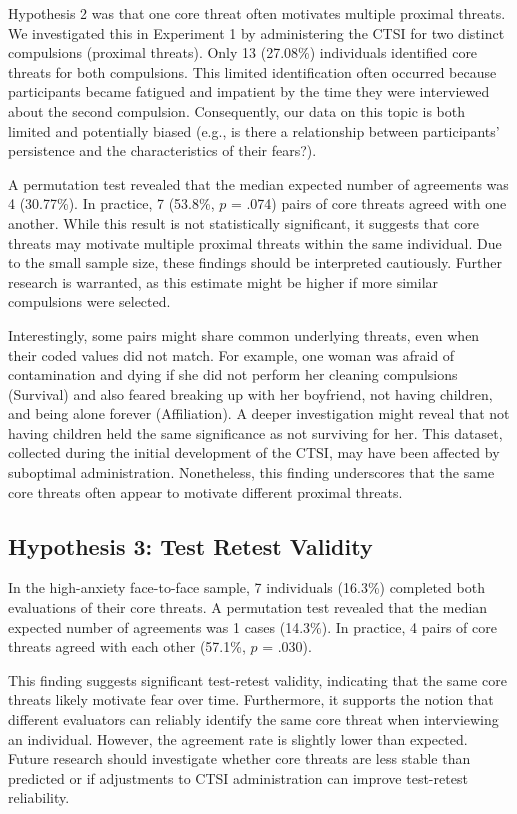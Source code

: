\documentclass[
  man,floatsintext]{apa7}
\begin{document}
Hypothesis 2 was that one core threat often motivates multiple proximal threats.
We investigated this in Experiment 1 by administering the CTSI for two distinct compulsions (proximal threats).
Only 13 (27.08\%) individuals identified core threats for both compulsions.
This limited identification often occurred because participants became fatigued and impatient by the time they were interviewed about the second compulsion.
Consequently, our data on this topic is both limited and potentially biased (e.g., is there a relationship between participants' persistence and the characteristics of their fears?).

A permutation test revealed that the median expected number of agreements was 4 (30.77\%).
In practice, 7 (53.8\%, \(p\) = .074) pairs of core threats agreed with one another.
While this result is not statistically significant, it suggests that core threats may motivate multiple proximal threats within the same individual.
Due to the small sample size, these findings should be interpreted cautiously.
Further research is warranted, as this estimate might be higher if more similar compulsions were selected.

Interestingly, some pairs might share common underlying threats, even when their coded values did not match.
For example, one woman was afraid of contamination and dying if she did not perform her cleaning compulsions (Survival) and also feared breaking up with her boyfriend, not having children, and being alone forever (Affiliation).
A deeper investigation might reveal that not having children held the same significance as not surviving for her.
This dataset, collected during the initial development of the CTSI, may have been affected by suboptimal administration.
Nonetheless, this finding underscores that the same core threats often appear to motivate different proximal threats.

\subsection{Hypothesis 3: Test Retest Validity}\label{hypothesis-3-test-retest-validity}

In the high-anxiety face-to-face sample, 7 individuals (16.3\%) completed both evaluations of their core threats.
A permutation test revealed that the median expected number of agreements was 1 cases (14.3\%).
In practice, 4 pairs of core threats agreed with each other (57.1\%, \(p\) = .030).

This finding suggests significant test-retest validity, indicating that the same core threats likely motivate fear over time.
Furthermore, it supports the notion that different evaluators can reliably identify the same core threat when interviewing an individual.
However, the agreement rate is slightly lower than expected.
Future research should investigate whether core threats are less stable than predicted or if adjustments to CTSI administration can improve test-retest reliability.
\end{document}
